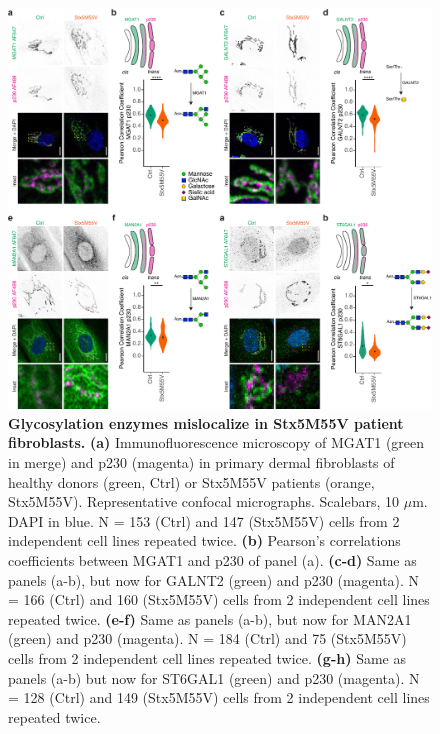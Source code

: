 \begin{figure}
    \includegraphics[keepaspectratio=true,width=\textwidth,height=\textheight]{chapters/chapter6/chapter6_SupplementaryFigure7.pdf}
    \caption{\textbf{Glycosylation enzymes mislocalize in Stx5M55V patient fibroblasts.} \textbf{(a)} Immunofluorescence microscopy of MGAT1 (green in merge) and p230 (magenta) in primary dermal fibroblasts of healthy donors (green, Ctrl) or Stx5M55V patients (orange, Stx5M55V). Representative confocal micrographs. Scalebars, 10 $\mu$m. DAPI in blue. N = 153 (Ctrl) and 147 (Stx5M55V) cells from 2 independent cell lines repeated twice. \textbf{(b)} Pearson's correlations coefficients between MGAT1 and p230 of panel (a). \textbf{(c-d)} Same as panels (a-b), but now for GALNT2 (green) and p230 (magenta). N = 166 (Ctrl) and 160 (Stx5M55V) cells from 2 independent cell lines repeated twice. \textbf{(e-f)} Same as panels (a-b), but now for MAN2A1 (green) and p230 (magenta). N = 184 (Ctrl) and 75 (Stx5M55V) cells from 2 independent cell lines repeated twice. \textbf{(g-h)} Same as panels (a-b) but now for ST6GAL1 (green) and p230 (magenta). N = 128 (Ctrl) and 149 (Stx5M55V) cells from 2 independent cell lines repeated twice.}
    \label{fig:ch6supfig7}
\end{figure}

\clearpage


